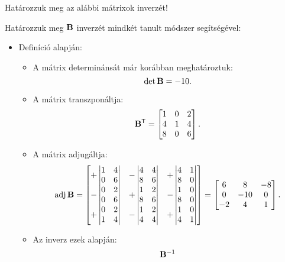 \begin{exercise}{Határozzuk meg az alábbi mátrixok inverzét!}
{    \tcbline

    Határozzuk meg $\mathbf{B}$ inverzét mindkét tanult módszer segítségével:
    \begin{itemize}
      \item Definíció alapján:
            \begin{itemize}
              \item A mátrix determinánsát már korábban meghatároztuk:
                    \[
                      \det \mathbf{B} = -10
                      \text.
                    \]

              \item A mátrix transzponáltja:
                    \[
                      \mathbf{B}^{\mathsf T} = \begin{bmatrix}
                        1 & 0 & 2 \\
                        4 & 1 & 4 \\
                        8 & 0 & 6
                      \end{bmatrix}
                      \text.
                    \]
              \item A mátrix adjugáltja:
                    \newcommand{\qvmat}[4]{\begin{vmatrix}#1 & #2 \\ #3 & #4\end{vmatrix}}
                    \[
                      \adj \rmat B = \begin{bmatrix}
                        +\qvmat{1}{4}{0}{6} & -\qvmat{4}{4}{8}{6} & +\qvmat{4}{1}{8}{0} \\
                        -\qvmat{0}{2}{0}{6} & +\qvmat{1}{2}{8}{6} & -\qvmat{1}{0}{8}{0} \\
                        +\qvmat{0}{2}{1}{4} & -\qvmat{1}{2}{4}{4} & +\qvmat{1}{0}{4}{1} \\
                      \end{bmatrix} = \begin{bmatrix}
                        6  & 8   & -8 \\
                        0  & -10 & 0  \\
                        -2 & 4   & 1  \\
                      \end{bmatrix}
                      \text.
                    \]
              \item Az inverz ezek alapján:
                    \begin{align*}
                      \rmat B^{-1}

\end{align*}
\end{itemize}
\end{itemize}}
\end{exercise}
